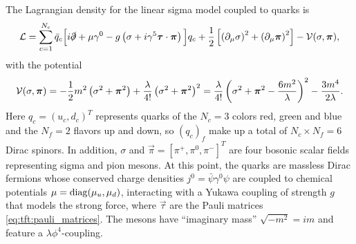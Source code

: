 The Lagrangian density for the linear sigma model coupled to quarks is
\begin{equation}
	\mathcal{L} = \sum_{c=1}^{N_c} \bar{q}_c \Big[ i \slashed\partial + \mu \gamma^0 - g \left( \sigma + i \gamma^5 {\bm{\tau}} \cdot {\bm{\pi}} \right) \Big] q_c
	      + \frac12 \left[ \left( \partial_\mu \sigma \right)^2 + \left( \partial_\mu {\bm{\pi}} \right)^2 \right] - \mathcal{V}(\sigma,{\bm{\pi}}) ,
\label{eq:lsm:lagrangian}
\end{equation}
with the potential
\begin{equation}
	\mathcal{V}(\sigma,{\bm{\pi}}) = -\frac12 m^2 \left( \sigma^2 + {\bm{\pi}}^2 \right) + \frac{\lambda}{4!} \left( \sigma^2 + {\bm{\pi}}^2 \right)^2
	                     = \frac{\lambda}{4!} \left( \sigma^2 + {\bm{\pi}}^2 - \frac{6m^2}{\lambda} \right)^2 -\frac{3 m^4}{2 \lambda} .
\label{eq:lsm:potential}
\end{equation}
Here $q_c = (u_c, d_c)^T$ represents quarks of the $N_c = 3$ colors red, green and blue and the $N_f = 2$ flavors up and down, so $(q_c)_f$ make up a total of $N_c \times N_f = 6$ Dirac spinors.
In addition, $\sigma$ and $\vec\pi = [\pi^+, \pi^0, \pi^-]^T$ are four bosonic scalar fields representing sigma and pion mesons.
At this point, the quarks are massless Dirac fermions whose conserved charge densities $j^0 = \bar\psi \gamma^0 \psi$ are coupled to chemical potentials $\mu = \operatorname{diag}(\mu_u, \mu_d)$, interacting with a Yukawa coupling of strength $g$ that models the strong force, where $\vec\tau$ are the Pauli matrices \eqref{eq:tft:pauli_matrices}.
The mesons have ``imaginary mass'' $\sqrt{-m^2} = i m$ and feature a $\lambda \phi^4$-coupling.

